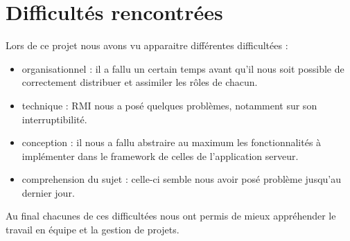 \section{Difficultés rencontrées}
Lors de ce projet nous avons vu apparaitre différentes difficultées : 
\begin{itemize}
 \item organisationnel : il a fallu un certain temps avant qu'il nous soit possible de correctement distribuer et assimiler les rôles de chacun.
 \item technique : RMI nous a posé quelques problèmes, notamment sur son interruptibilité.
 \item conception : il nous a fallu abstraire au maximum les fonctionnalités à implémenter dans le framework de celles de l'application serveur.
 \item comprehension du sujet : celle-ci semble nous avoir posé problème jusqu'au dernier jour.
\end{itemize}


Au final chacunes de ces difficultées nous ont permis de mieux appréhender le travail en équipe et la gestion de projets.
